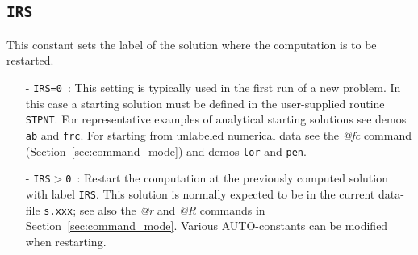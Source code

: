 \documentclass[12pt]{report}
\begin{document}
\subsection{\tt IRS}  \label{sec:IRS}
This constant sets the label of the solution where the computation
is to be restarted.
\begin{itemize}
\item[-] {\tt IRS=0}~:  
  This setting is typically used in the first run of a new problem.
  In this case a starting solution must be defined in the user-supplied
  routine {\tt STPNT}.
  For representative examples of analytical starting solutions 
  see demos {\tt ab} and {\tt frc}.
  For starting from unlabeled numerical data see the {\it @fc} command
  (Section~\ref{sec:command_mode}) and demos {\tt lor} and {\tt pen}.
  
\item[-] {\tt IRS$>$0}~: 
  Restart the computation at the previously computed solution with label {\tt IRS}. 
  This solution is normally expected to be in the current data-file 
 {\tt s.xxx}; see also the {\it @r} and {\it @R} commands in 
 Section~\ref{sec:command_mode}.
 Various {\cal AUTO}-constants can be modified when restarting.
\end{itemize}
\end{document}
